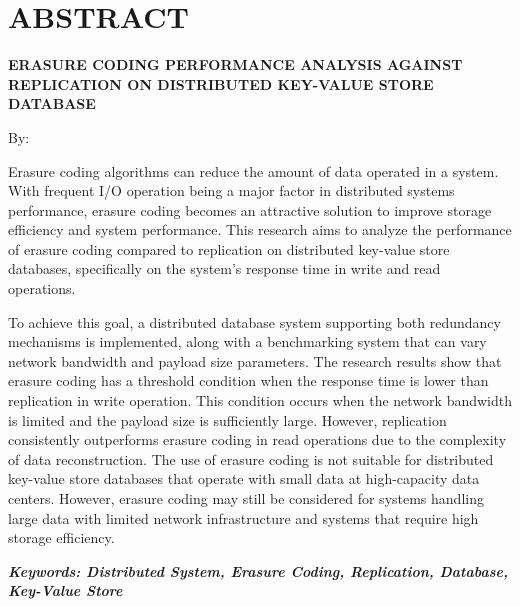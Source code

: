\clearpage
\chapter*{ABSTRACT}

\begin{center}
  \center
  \begin{singlespace}
    \large\bfseries\MakeUppercase{Erasure Coding Performance Analysis Against Replication on Distributed Key-Value Store Database}
    
    \normalfont\normalsize
    By:
    
    \bfseries \theauthor
  \end{singlespace}
\end{center}


\begin{singlespace}
  \small
  Erasure coding algorithms can reduce the amount of data operated in a system. With frequent I/O operation being a major factor in distributed systems performance, erasure coding becomes an attractive solution to improve storage efficiency and system performance. This research aims to analyze the performance of erasure coding compared to replication on distributed key-value store databases, specifically on the system's response time in write and read operations.

  To achieve this goal, a distributed database system supporting both redundancy mechanisms is implemented, along with a benchmarking system that can vary network bandwidth and payload size parameters. The research results show that erasure coding has a threshold condition when the response time is lower than replication in write operation. This condition occurs when the network bandwidth is limited and the payload size is sufficiently large. However, replication consistently outperforms erasure coding in read operations due to the complexity of data reconstruction. The use of erasure coding is not suitable for distributed key-value store databases that operate with small data at high-capacity data centers. However, erasure coding may still be considered for systems handling large data with limited network infrastructure and systems that require high storage efficiency.

  \textbf{\textit{Keywords: Distributed System, Erasure Coding, Replication, Database, Key-Value Store }}
\end{singlespace}
\clearpage

\clearpage